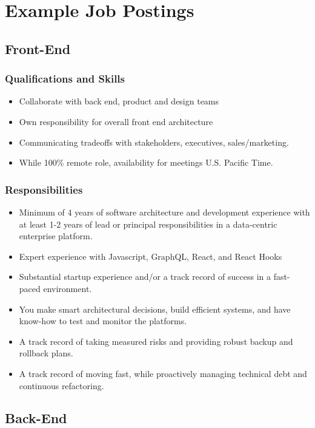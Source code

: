 \section{Example Job Postings}
\subsection*{Front-End}

\subsubsection{Qualifications and Skills}
\begin{itemize}
    \item Collaborate with back end, product and design teams
    \item Own responsibility for overall front end architecture
    \item Communicating tradeoffs with stakeholders, executives, sales/marketing.
    \item While 100\% remote role, availability for meetings U.S. Pacific Time.
\end{itemize}

\subsubsection{Responsibilities}
\begin{itemize}
    \item Minimum of 4 years of software architecture and development experience with at least 1-2 years of lead or principal responsibilities in a data-centric enterprise platform.
    \item Expert experience with Javascript, GraphQL, React, and React Hooks
    \item Substantial startup experience and/or a track record of success in a fast-paced environment.
    \item You make smart architectural decisions, build efficient systems, and have know-how to test and monitor the platforms.
    \item A track record of taking measured risks and providing robust backup and rollback plans.
    \item A track record of moving fast, while proactively managing technical debt and continuous refactoring.
\end{itemize}


\subsection*{Back-End}
